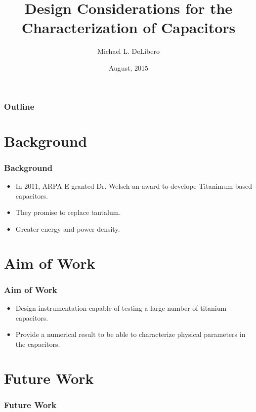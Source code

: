 \documentclass{beamer}
\title{Design Considerations for the Characterization of Capacitors}
\author{Michael L. DeLibero}
\date{August, 2015}
\institute[CWRU]{Case Western Reserve University}
\begin{document}
\begin{frame}
    \titlepage
\end{frame}



\begin{frame}
  \frametitle{Outline}
  \tableofcontents
\end{frame}

\section{Background}
\begin{frame}
    \frametitle{Background}
    \begin{itemize}
        \item In 2011, ARPA-E granted Dr. Welsch an award to develope Titanimum-based capacitors.
        \item They promise to replace tantalum.
        \item Greater energy and power density.
    \end{itemize}
\end{frame}

\section{Aim of Work}
\begin{frame}
    \frametitle{Aim of Work}
    \begin{itemize}
        \item Design instrumentation capable of testing a large number of titanium capacitors.
        \item Provide a numerical result to be able to characterize physical parameters in the capacitors.
    \end{itemize}
\end{frame}




\section{Future Work}
\begin{frame}
    \frametitle{Future Work}
    
\end{frame}


\end{document}
